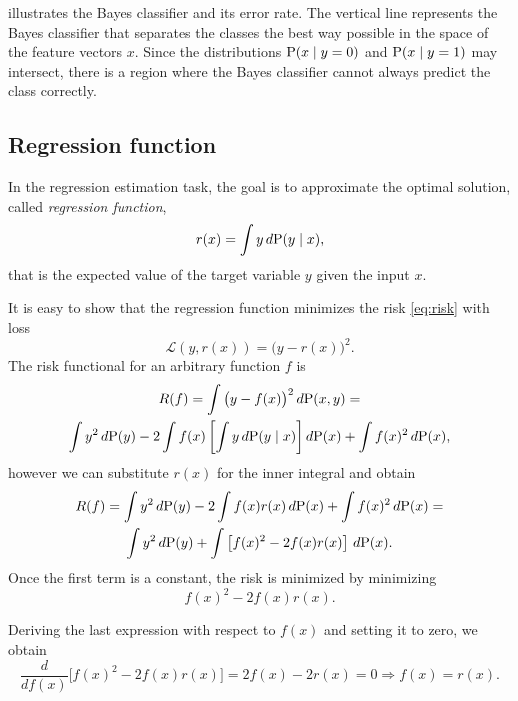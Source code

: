  illustrates the Bayes classifier and its error rate.
The vertical line represents the Bayes classifier that separates the classes the best way
possible in the space of the feature vectors $x$.  Since the distributions $\operatorname{P}(x \mid y
= 0)$ and $\operatorname{P}(x \mid y = 1)$ may intersect, there is a region where the Bayes
classifier cannot always predict the class correctly.

\subsection{Regression function}
\label{sec:regression-function}

In the regression estimation task, the goal is to approximate the optimal solution, called
\emph{regression function},
\begin{equation}
  \label{eq:regression-function}
  r(x) = \int y\, d\!\operatorname{P}(y \mid x)\text{,}
\end{equation}
that is the expected value of the target variable $y$ given the input $x$.

It is easy to show that the regression function minimizes the risk \eqref{eq:risk} with
loss
\[
  \mathcal{L}(y, r(x)) = \big(y - r(x)\big)^2\text{.}
\]
The risk functional for an arbitrary function $f$ is
\begin{multline*}
  R(f) =
    \int \big(y - f(x)\big)^2\, d\!\operatorname{P}(x, y) =\\
    \int y^2\, d\!\operatorname{P}(y) -
    2 \int f(x) \left[ \int y\, d\!\operatorname{P}(y \mid x) \right] d\!\operatorname{P}(x) +
    \int f(x)^2\, d\!\operatorname{P}(x)\text{,}
\end{multline*}
however we can substitute $r(x)$ for the inner integral and obtain
\begin{multline*}
  R(f) =
    \int y^2\, d\!\operatorname{P}(y) - 2 \int f(x) r(x)\, d\!\operatorname{P}(x) + \int f(x)^2\, d\!\operatorname{P}(x) = \\
    \int y^2\, d\!\operatorname{P}(y) + \int \left[ f(x)^2 - 2 f(x) r(x) \right]\, d\!\operatorname{P}(x)\text{.}
\end{multline*}
Once the first term is a constant, the risk is minimized by minimizing
\[
  f(x)^2 - 2 f(x) r(x)\text{.}
\]

Deriving the last expression with respect to $f(x)$ and setting it to zero, we obtain
\begin{equation*}
  \frac{d}{d f(x)} \Big[ f(x)^2 - 2 f(x) r(x) \Big] = 2 f(x) - 2 r(x) = 0 \Rightarrow
  f(x) = r(x)\text{.}
\end{equation*}

